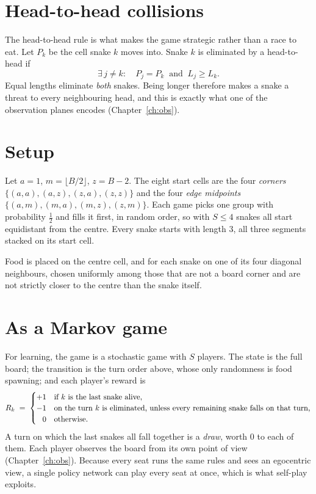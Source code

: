 \section{Head-to-head collisions}

The head-to-head rule is what makes the game strategic rather than a race to eat. Let
$P_k$ be the cell snake $k$ moves into. Snake $k$ is eliminated by a head-to-head if
\[
  \exists\, j\ne k:\quad P_j = P_k \ \text{ and }\ L_j \ge L_k .
\]
Equal lengths eliminate \emph{both} snakes. Being longer therefore makes a snake a
threat to every neighbouring head, and this is exactly what one of the observation
planes encodes (Chapter~\ref{ch:obs}).

\section{Setup}

\begin{defbox}
Let $a=1$, $m=\lfloor B/2\rfloor$, $z=B-2$. The eight start cells are the four
\emph{corners} $\{(a,a),(a,z),(z,a),(z,z)\}$ and the four \emph{edge midpoints}
$\{(a,m),(m,a),(m,z),(z,m)\}$. Each game picks one group with probability $\tfrac12$ and
fills it first, in random order, so with $S\le4$ snakes all start equidistant from the
centre. Every snake starts with length $3$, all three segments stacked on its start cell.

Food is placed on the centre cell, and for each snake on one of its four diagonal
neighbours, chosen uniformly among those that are not a board corner and are not
strictly closer to the centre than the snake itself.
\end{defbox}

\section{As a Markov game}

For learning, the game is a stochastic game with $S$ players. The state is
the full board; the transition is the turn order above, whose only randomness is food
spawning; and each player's reward is
\[
  R_k \;=\;
  \begin{cases}
    +1 & \text{if } k \text{ is the last snake alive,}\\
    -1 & \text{on the turn } k \text{ is eliminated, unless every remaining snake falls on that turn,}\\
    \hphantom{+}0 & \text{otherwise.}
  \end{cases}
\]
A turn on which the last snakes all fall together is a \emph{draw}, worth $0$ to each of
them. Each player observes the board from its own point of view (Chapter~\ref{ch:obs}).
Because every seat runs the same rules and sees an egocentric view, a single policy
network can play every seat at once, which is what self-play exploits.
